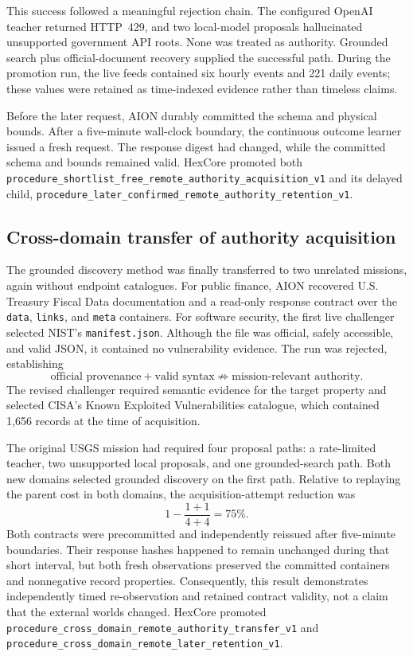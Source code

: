 This success followed a meaningful rejection chain.  The configured OpenAI
teacher returned HTTP~429, and two local-model proposals hallucinated
unsupported government API roots.  None was treated as authority.  Grounded
search plus official-document recovery supplied the successful path.  During
the promotion run, the live feeds contained six hourly events and 221 daily
events; these values were retained as time-indexed evidence rather than timeless
claims.

Before the later request, AION durably committed the schema and physical bounds.
After a five-minute wall-clock boundary, the continuous outcome learner issued a
fresh request.  The response digest had changed, while the committed schema and
bounds remained valid.  HexCore promoted both
\texttt{procedure\_shortlist\_free\_remote\_authority\_acquisition\_v1} and its
delayed child,
\texttt{procedure\_later\_confirmed\_remote\_authority\_retention\_v1}.

\subsection{Cross-domain transfer of authority acquisition}

The grounded discovery method was finally transferred to two unrelated
missions, again without endpoint catalogues.  For public finance, AION recovered
U.S. Treasury Fiscal Data documentation and a read-only response contract over
the \texttt{data}, \texttt{links}, and \texttt{meta} containers.  For software
security, the first live challenger selected NIST's \texttt{manifest.json}.
Although the file was official, safely accessible, and valid JSON, it contained
no vulnerability evidence.  The run was rejected, establishing
\[
\text{official provenance}+\text{valid syntax}
\not\Rightarrow \text{mission-relevant authority}.
\]
The revised challenger required semantic evidence for the target property and
selected CISA's Known Exploited Vulnerabilities catalogue, which contained
1,656 records at the time of acquisition.

The original USGS mission had required four proposal paths: a rate-limited
teacher, two unsupported local proposals, and one grounded-search path.  Both
new domains selected grounded discovery on the first path.  Relative to replaying
the parent cost in both domains, the acquisition-attempt reduction was
\[
1-\frac{1+1}{4+4}=75\%.
\]
Both contracts were precommitted and independently reissued after five-minute
boundaries.  Their response hashes happened to remain unchanged during that
short interval, but both fresh observations preserved the committed containers
and nonnegative record properties.  Consequently, this result demonstrates
independently timed re-observation and retained contract validity, not a claim
that the external worlds changed.  HexCore promoted
\texttt{procedure\_cross\_domain\_remote\_authority\_transfer\_v1} and
\texttt{procedure\_cross\_domain\_remote\_later\_retention\_v1}.

